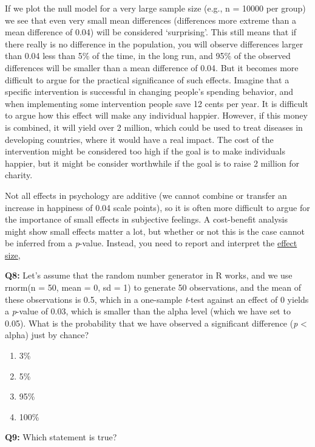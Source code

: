 \documentclass[
  oneside]{krantz}
\providecommand{\tightlist}{%
  \setlength{\itemsep}{0pt}\setlength{\parskip}{0pt}}
\begin{document}
If we plot the null model for a very large sample size (e.g., n = 10000 per group) we see that even very small mean differences (differences more extreme than a mean difference of 0.04) will be considered `surprising'. This still means that if there really is no difference in the population, you will observe differences larger than 0.04 less than 5\% of the time, in the long run, and 95\% of the observed differences will be smaller than a mean difference of 0.04. But it becomes more difficult to argue for the practical significance of such effects. Imagine that a specific intervention is successful in changing people's spending behavior, and when implementing some intervention people save 12 cents per year. It is difficult to argue how this effect will make any individual happier. However, if this money is combined, it will yield over 2 million, which could be used to treat diseases in developing countries, where it would have a real impact. The cost of the intervention might be considered too high if the goal is to make individuals happier, but it might be consider worthwhile if the goal is to raise 2 million for charity.

Not all effects in psychology are additive (we cannot combine or transfer an increase in happiness of 0.04 scale points), so it is often more difficult to argue for the importance of small effects in subjective feelings. A cost-benefit analysis might show small effects matter a lot, but whether or not this is the case cannot be inferred from a \emph{p}-value. Instead, you need to report and interpret the \protect\hyperlink{effectsize}{effect size},

\textbf{Q8:} Let's assume that the random number generator in R works, and we use rnorm(n = 50, mean = 0, sd = 1) to generate 50 observations, and the mean of these observations is 0.5, which in a one-sample \emph{t}-test against an effect of 0 yields a \emph{p}-value of 0.03, which is smaller than the alpha level (which we have set to 0.05). What is the probability that we have observed a significant difference (\emph{p} \textless{} alpha) just by chance?

\begin{enumerate}
\def\labelenumi{\Alph{enumi})}
\tightlist
\item
  3\%
\item
  5\%
\item
  95\%
\item
  100\%
\end{enumerate}

\textbf{Q9:} Which statement is true?
\end{document}
